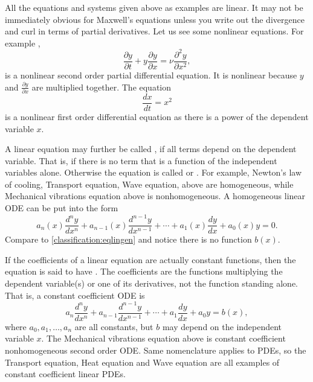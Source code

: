\documentclass[12pt]{book}
\begin{document}
All the equations and systems given above as examples are linear.  
It may not be immediately obvious for Maxwell's equations unless you write out
the divergence and curl in terms of partial derivatives.  Let us see some
nonlinear equations.  For example ,
\begin{equation*}
\frac{\partial y}{\partial t} + 
y \frac{\partial y}{\partial x} =
\nu \frac{\partial^2 y}{\partial x^2} ,
\end{equation*}
is a nonlinear second order partial differential equation.  It is nonlinear
because $y$ and $\frac{\partial y}{\partial x}$ are multiplied together.
The equation
\begin{equation} \label{classification:eqnonlinode}
\frac{dx}{dt} = x^2
\end{equation}
is a nonlinear first order differential equation as there is a power of
the dependent variable $x$.

\medskip

A linear equation may further be called \emph{}, if
all terms depend on the dependent variable.  That is, if there is no
term that is a function of the independent variables alone.  Otherwise the
equation is called \emph{} or
\emph{}.  For example,
Newton's law of cooling, Transport equation, Wave equation, above are homogeneous,
while Mechanical vibrations equation above is nonhomogeneous.
A homogeneous linear ODE can be put into the form
\begin{equation*}
a_n(x) \frac{d^n y}{dx^n} + 
a_{n-1}(x) \frac{d^{n-1} y}{dx^{n-1}} + 
\cdots
+
a_{1}(x) \frac{dy}{dx}
+
a_{0}(x) y = 0 .
\end{equation*}
Compare to \eqref{classification:eqlingen} and notice there is no
function $b(x)$.

\medskip

If the coefficients of a linear equation are actually constant functions,
then the equation is said to have \emph{}.
The coefficients are the functions multiplying the dependent
variable(s) or one of its derivatives, not the function standing alone.
That is, a constant coefficient ODE is
\begin{equation*}
a_n \frac{d^n y}{dx^n} + 
a_{n-1} \frac{d^{n-1} y}{dx^{n-1}} + 
\cdots
+
a_{1} \frac{dy}{dx}
+
a_{0} y = b(x) ,
\end{equation*}
where $a_0, a_1, \ldots, a_n$ are all constants, but $b$ may depend on 
the independent variable $x$.  The Mechanical vibrations equation
above is constant coefficient nonhomogeneous second order ODE.
Same nomenclature applies to PDEs, so the Transport equation,
Heat equation and Wave equation are all examples of constant coefficient
linear PDEs.
\end{document}
